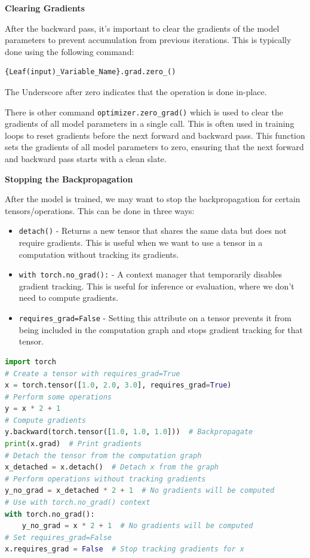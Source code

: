 \documentclass[12pt, a4paper]{article}
\begin{document}
\vspace{1em}

\textbf{Clearing Gradients}

After the backward pass, it's important to clear the gradients of the model parameters to prevent accumulation from previous iterations. This is typically done using the following command:

\begin{verbatim}
{Leaf(input)_Variable_Name}.grad.zero_()
\end{verbatim}

The Underscore after zero indicates that the operation is done in-place. 

There is other command \texttt{optimizer.zero\_grad()} which is used to clear the gradients of all model parameters in a single call. This is often used in training loops to reset gradients before the next forward and backward pass.
This function sets the gradients of all model parameters to zero, ensuring that the next forward and backward pass starts with a clean slate.

\vspace{1em}

\textbf{Stopping the Backpropagation}

After the model is trained, we may want to stop the backpropagation for certain tensors/operations. This can be done in three ways:

\begin{itemize}[nosep]
    \item \texttt{detach()} - Returns a new tensor that shares the same data but does not require gradients. This is useful when we want to use a tensor in a computation without tracking its gradients.
    \item \texttt{with torch.no\_grad():} - A context manager that temporarily disables gradient tracking. This is useful for inference or evaluation, where we don't need to compute gradients.
    \item \texttt{requires\_grad=False} - Setting this attribute on a tensor prevents it from being included in the computation graph and stops gradient tracking for that tensor.
\end{itemize}

\begin{lstlisting}[language=Python]
import torch
# Create a tensor with requires_grad=True
x = torch.tensor([1.0, 2.0, 3.0], requires_grad=True)
# Perform some operations
y = x * 2 + 1
# Compute gradients
y.backward(torch.tensor([1.0, 1.0, 1.0]))  # Backpropagate
print(x.grad)  # Print gradients
# Detach the tensor from the computation graph
x_detached = x.detach()  # Detach x from the graph
# Perform operations without tracking gradients
y_no_grad = x_detached * 2 + 1  # No gradients will be computed
# Use with torch.no_grad() context
with torch.no_grad():
    y_no_grad = x * 2 + 1  # No gradients will be computed
# Set requires_grad=False
x.requires_grad = False  # Stop tracking gradients for x
\end{lstlisting}
\end{document}
